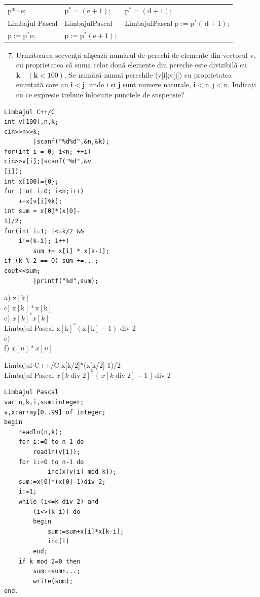 \documentclass[10pt]{article}
\begin{document}
\begin{center}
\begin{tabular}{lll}
p*=e; & $\mathrm{p}^{*}=(\mathrm{e}+1) ;$ & $\mathrm{p}^{*}=(\mathrm{d}+1) ;$ \\
Limbajul Pascal & LimbajulPascal & LimbajulPascal $\mathrm{p}:=\mathrm{p}^{*}(\mathrm{~d}+1)$; \\
$\mathrm{p}:=\mathrm{p}^{*} \mathrm{e} ;$ & $\mathrm{p}:=\mathrm{p}^{*}(\mathrm{e}+1) ;$ &  \\
\end{tabular}
\end{center}

\begin{enumerate}
  \setcounter{enumi}{6}
  \item Următoarea secvență afișează numărul de perechi de elemente din vectorul v, cu proprietatea că suma celor două elemente din pereche este divizibilă cu $\mathbf{k} \quad(\mathbf{k}<100)$. Se numără numai perechile (v[i];v[j]) cu proprietatea enunțată care au $\mathbf{i}<\mathbf{j}$, unde i și $\mathbf{j}$ sunt numere naturale, $\mathbf{i}<\mathrm{n}, \mathrm{j}<\mathrm{n}$. Indicați cu ce expresie trebuie înlocuite punctele de suspensie?
\end{enumerate}

\begin{verbatim}
Limbajul C++/C
int v[100],n,k;
cin>>n>>k;
        |scanf("%d%d",&n,&k);
for(int i = 0; i<n; ++i)
cin>>v[i];|scanf("%d",&v
[i]);
int x[100]={0};
for (int i=0; i<n;i++)
    ++x[v[i]%k];
int sum = x[0]*(x[0]-
1)/2;
for(int i=1; i<=k/2 &&
    i!=(k-i); i++)
        sum += x[i] * x[k-i];
if (k % 2 == O) sum +=...;
cout<<sum;
        |printf("%d",sum);
\end{verbatim}

a) $\mathrm{x}[\mathrm{k}]$\\
c) $\mathrm{x}[\mathrm{k}] * \mathrm{x}[\mathrm{k}]$\\
c) $x[k]^{*} x[k]$\\
Limbajul Pascal $\mathrm{x}[\mathrm{k}]^{*}(\mathrm{x}[\mathrm{k}]-1)$ div 2\\
e)\\
f) $x[n] * x[n]$

Limbajul C++/C x[k/2]*(x[k/2]-1)/2\\
Limbajul Pascal $x[k \operatorname{div} 2]^{*}$ ( $x[k \operatorname{div} 2]-1$ ) div 2

\begin{verbatim}
Limbajul Pascal
var n,k,i,sum:integer;
v,x:array[0..99] of integer;
begin
    readln(n,k);
    for i:=0 to n-1 do
        readln(v[i]);
    for i:=0 to n-1 do
            inc(x[v[i] mod k]);
    sum:=x[0]*(x[0]-1)div 2;
    i:=1;
    while (i<=k div 2) and
        (i<>(k-i)) do
        begin
            sum:=sum+x[i]*x[k-i];
            inc(i)
        end;
    if k mod 2=0 then
        sum:=sum+...;
        write(sum);
end.
\end{verbatim}
\end{document}
